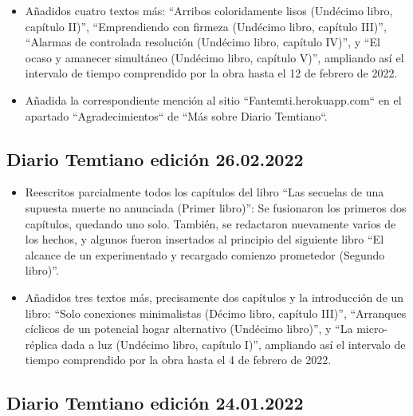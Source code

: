 \documentclass[
]{book}
\begin{document}
\begin{itemize}
\item
  Añadidos cuatro textos más: ``Arribos coloridamente lisos (Undécimo libro, capítulo II)'', ``Emprendiendo con firmeza (Undécimo libro, capítulo III)'', ``Alarmas de controlada resolución (Undécimo libro, capítulo IV)'', y ``El ocaso y amanecer simultáneo (Undécimo libro, capítulo V)'', ampliando así el intervalo de tiempo comprendido por la obra hasta el 12 de febrero de 2022.
\item
  Añadida la correspondiente mención al sitio ``Fantemti.herokuapp.com`` en el apartado ``Agradecimientos`` de ``Más sobre Diario Temtiano``.
\end{itemize}

\hypertarget{diario-temtiano-ediciuxf3n-26.02.2022}{%
\subsection*{Diario Temtiano edición 26.02.2022}\label{diario-temtiano-ediciuxf3n-26.02.2022}}

\begin{itemize}
\item
  Reescritos parcialmente todos los capítulos del libro ``Las secuelas de una supuesta muerte no anunciada (Primer libro)'': Se fusionaron los primeros dos capítulos, quedando uno solo. También, se redactaron nuevamente varios de los hechos, y algunos fueron insertados al principio del siguiente libro ``El alcance de un experimentado y recargado comienzo prometedor (Segundo libro)''.
\item
  Añadidos tres textos más, precisamente dos capítulos y la introducción de un libro: ``Solo conexiones minimalistas (Décimo libro, capítulo III)'', ``Arranques cíclicos de un potencial hogar alternativo (Undécimo libro)'', y ``La micro-réplica dada a luz (Undécimo libro, capítulo I)'', ampliando así el intervalo de tiempo comprendido por la obra hasta el 4 de febrero de 2022.
\end{itemize}

\hypertarget{diario-temtiano-ediciuxf3n-24.01.2022}{%
\subsection*{Diario Temtiano edición 24.01.2022}\label{diario-temtiano-ediciuxf3n-24.01.2022}}
\end{document}
